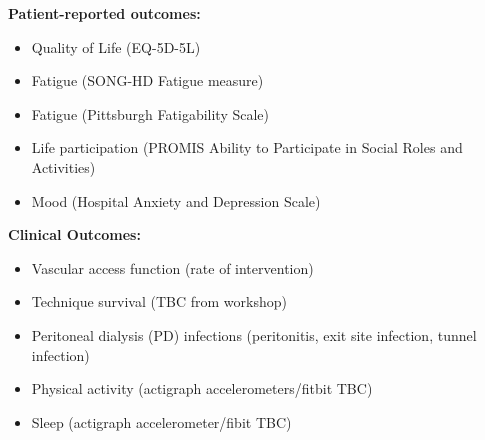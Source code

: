 \documentclass[
]{article}
\begin{document}
\textbf{Patient-reported outcomes:}
\begin{itemize}
  \item Quality of Life (EQ-5D-5L)
  \item Fatigue (SONG-HD Fatigue measure)
  \item Fatigue (Pittsburgh Fatigability Scale)
  \item Life participation (PROMIS Ability to Participate in Social Roles and Activities)
  \item Mood (Hospital Anxiety and Depression Scale)
\end{itemize}

\textbf{Clinical Outcomes:}
\begin{itemize}
  \item Vascular access function (rate of intervention)
  \item Technique survival (TBC from workshop)
  \item Peritoneal dialysis (PD) infections (peritonitis, exit site infection, tunnel infection)
  \item Physical activity (actigraph accelerometers/fitbit TBC)
  \item Sleep (actigraph accelerometer/fibit TBC)
\end{itemize}
\end{document}

